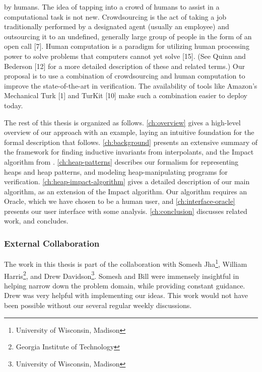 by humans.
The idea of tapping into a crowd of humans to assist in a computational
task is not new. Crowdsourcing is the act of taking a
job traditionally performed by a designated agent (usually an employee)
and outsourcing it to an undefined, generally large group
of people in the form of an open call [7]. Human computation is a
paradigm for utilizing human processing power to solve problems
that computers cannot yet solve [15]. (See Quinn and Bederson [12]
for a more detailed description of these and related terms.) Our proposal
is to use a combination of crowdsourcing and human computation
to improve the state-of-the-art in verification. The availability
of tools like Amazon’s Mechanical Turk [1] and TurKit [10] make
such a combination easier to deploy today.





The rest of this thesis is organized as follows. \autoref{ch:overview} gives a high-level overview of our approach with an example, laying an intuitive foundation for the formal description that follows. \autoref{ch:background} presents an extensive summary of the framework for finding inductive invariants from interpolants, and the Impact algorithm from \cite{mcmillan06}. \autoref{ch:heap-patterns} describes our formalism for representing heaps and heap patterns, and modeling heap-manipulating programs for verification. \autoref{ch:heap-impact-algorithm} gives a detailed description of our main algorithm, as an extension of the Impact algorithm. Our algorithm requires an Oracle, which we have chosen to be a human user, and \autoref{ch:interface-oracle} presents our user interface with some analysis. \autoref{ch:conclusion} discusses related work, and concludes.

\subsubsection{External Collaboration}
The work in this thesis is part of the collaboration with Somesh Jha\footnote{University of Wisconsin, Madison}, William Harris\footnote{Georgia Institute of Technology}, and Drew Davidson\footnote{University of Wisconsin, Madison}. Somesh and Bill were immensely insightful in helping narrow down the problem domain, while providing constant guidance. Drew was very helpful with implementing our ideas. This work would not have been possible without our several regular weekly discussions.

